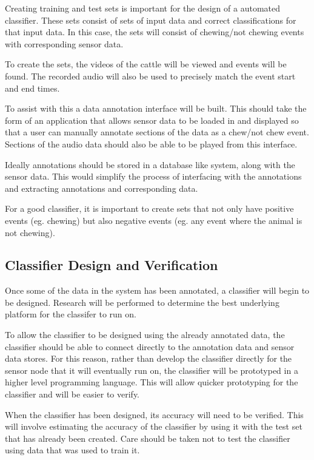 Creating training and test sets is important for the design of a automated classifier. These sets consist of sets of input data and correct classifications for that input data. In this case, the sets will consist of chewing/not chewing events with corresponding sensor data. 

To create the sets, the videos of the cattle will be viewed and events will be found. The recorded audio will also be used to precisely match the event start and end times.  

To assist with this a data annotation interface  will be built. This should take the form of an application that allows sensor data to be loaded in and displayed so that a user can manually annotate sections of the data as a chew/not chew event. Sections of the audio data should also be able to be played from this interface. 

Ideally annotations should be stored in a database like system, along with the sensor data. This would simplify the process of interfacing with the annotations and extracting annotations and corresponding data. 

For a good classifier, it is important to create sets that not only have positive events (eg. chewing) but also negative events (eg. any event where the animal is not chewing).

\subsection{Classifier Design and Verification} 

Once some of the data in the system has been annotated, a classifier will begin to be designed. Research will be performed to determine the best underlying platform for the classifer to run on. 

To allow the classifier to be designed using the already annotated data, the classifier should be able to connect directly to the annotation data and sensor data stores. For this reason, rather than develop the classifier directly for the sensor node that it will eventually run on, the classifier will be prototyped in a higher level programming language. This will allow quicker prototyping for the classifier and will be easier to verify.

When the classifier has been designed, its accuracy will need to be verified. This will involve estimating the accuracy of the classifier by using it with the test set that has already been created. Care should be taken not to test the classifier using data that was used to train it. 